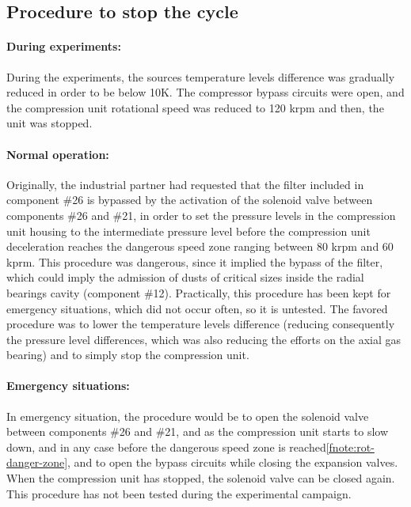 \subsection{Procedure to stop the cycle}
\label{sec:awp-proc-stop}

\paragraph{During experiments:}

During the experiments, the sources temperature levels difference was
gradually reduced in order to be below \num{10}\si{\kelvin}. The
compressor bypass circuits were open, and the compression unit
rotational speed was reduced to 120 krpm and then, the unit was
stopped.

\paragraph{Normal operation:}

Originally, the industrial partner had requested that the filter
included in component \#26 is bypassed by the activation of the
solenoid valve between components \#26 and \#21, in order to set the
pressure levels in the compression unit housing to the intermediate
pressure level before the compression unit deceleration reaches the
dangerous speed zone ranging between 80 krpm and 60
kprm. This procedure was dangerous, since it
implied the bypass of the filter, which could imply the admission of
dusts of critical sizes inside the radial bearings
cavity (component \#12). Practically,
this procedure has been kept for emergency situations, which did not
occur often, so it is untested. The favored procedure was to lower the
temperature levels difference (reducing consequently the pressure
level differences, which was also reducing the efforts on the axial
gas bearing) and to simply stop the compression unit.

\paragraph{Emergency situations:}

In emergency situation, the procedure would be to open the solenoid
valve between components \#26 and \#21, and as the compression unit
starts to slow down, and in any case before the dangerous speed zone
is reached\cref{fnote:rot-danger-zone}, and to open the bypass
circuits while closing the expansion valves. When the compression unit
has stopped, the solenoid valve can be closed again. This procedure
has not been tested during the experimental campaign.


